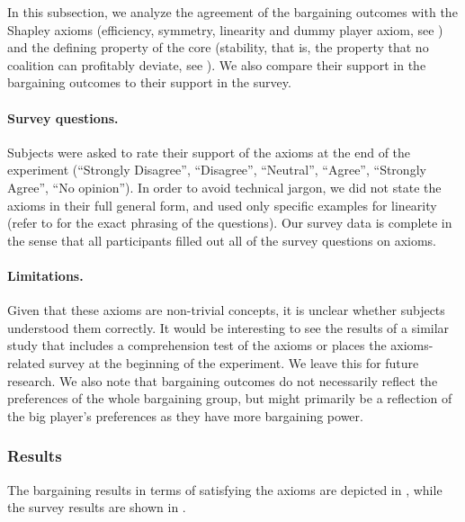 \documentclass[12pt]{article}
\begin{document}
In this subsection, we analyze the agreement of the bargaining outcomes with the Shapley axioms (efficiency, symmetry, linearity and dummy player axiom, see ) and the defining property of the core (stability, that is, the property that no coalition can profitably deviate, see ). We also compare their support in the bargaining outcomes to their support in the survey.

\paragraph{Survey questions.} Subjects were asked to rate their support of the axioms at the end of the experiment (``Strongly Disagree'', ``Disagree'', ``Neutral'', ``Agree'', ``Strongly Agree'', ``No opinion''). In order to avoid technical jargon, we did not state the axioms in their full general form, and used only specific examples for linearity (refer to  for the exact phrasing of the questions). Our survey data is complete in the sense that all participants filled out all of the survey questions on axioms.

\paragraph{Limitations.}
Given that these axioms are non-trivial concepts, it is unclear whether subjects understood them correctly. It would be interesting to see the results of a similar study that includes a comprehension test of the axioms or places the axioms-related survey at the beginning of the experiment. We leave this for future research. 
We also note that bargaining outcomes do not necessarily reflect the preferences of the whole bargaining group, but might primarily be a reflection of the big player's preferences as they have more bargaining power.

\subsubsection{Results}

The bargaining results in terms of satisfying the axioms are depicted in , while the survey results are shown in . 
\end{document}
